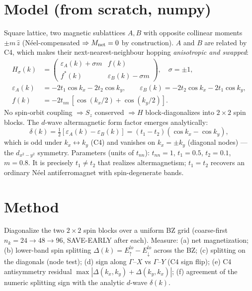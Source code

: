 \documentclass[11pt]{article}
\begin{document}
\section{Model (from scratch, numpy)}
Square lattice, two magnetic sublattices $A,B$ with opposite collinear moments $\pm m\,\hat z$
(N\'eel-compensated $\Rightarrow M_{\rm net}=0$ by construction). $A$ and $B$ are related by C4,
which makes their next-nearest-neighbour hopping \emph{anisotropic and swapped}:
\begin{align}
H_\sigma(k)&=\begin{pmatrix}\varepsilon_A(k)+\sigma m & f(k)\\ f^*(k)&\varepsilon_B(k)-\sigma m\end{pmatrix},\quad \sigma=\pm1,\\
\varepsilon_A(k)&=-2t_1\cos k_x-2t_2\cos k_y,\qquad \varepsilon_B(k)=-2t_2\cos k_x-2t_1\cos k_y,\\
f(k)&=-2t_{nn}\,[\cos(k_x/2)+\cos(k_y/2)].
\end{align}
No spin-orbit coupling $\Rightarrow S_z$ conserved $\Rightarrow H$ block-diagonalizes into
$2\times2$ spin blocks. The $d$-wave altermagnetic form factor emerges analytically:
\begin{equation}
\delta(k)=\tfrac12[\varepsilon_A(k)-\varepsilon_B(k)]=(t_1-t_2)(\cos k_x-\cos k_y),
\end{equation}
which is odd under $k_x\!\leftrightarrow\!k_y$ (C4) and vanishes on $k_x=\pm k_y$ (diagonal nodes) ---
the $d_{x^2-y^2}$ symmetry. Parameters (units of $t_{nn}$): $t_{nn}=1$, $t_1=0.5$, $t_2=0.1$,
$m=0.8$. It is precisely $t_1\neq t_2$ that realizes altermagnetism; $t_1=t_2$ recovers an
ordinary N\'eel antiferromagnet with spin-degenerate bands.

\section{Method}
Diagonalize the two $2\times2$ spin blocks over a uniform BZ grid (coarse-first
$n_k=24\to48\to96$, SAVE-EARLY after each). Measure: (a) net magnetization; (b) lower-band spin
splitting $\Delta(k)=E^{lo}_\uparrow-E^{lo}_\downarrow$ across the BZ; (c) splitting on the
diagonals (node test); (d) sign along $\Gamma$--$X$ vs $\Gamma$--$Y$ (C4 sign flip); (e)
C4 antisymmetry residual $\max|\Delta(k_x,k_y)+\Delta(k_y,k_x)|$; (f) agreement of the numeric
splitting sign with the analytic $d$-wave $\delta(k)$.
\end{document}
